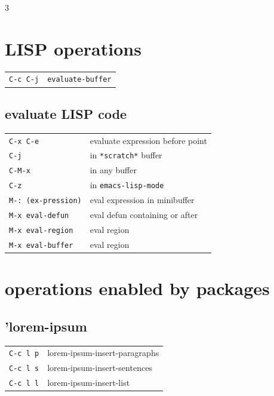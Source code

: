 \documentclass[11pt,landscape,a4paper]{article}
\begin{document}
\begin{multicols}{3}
\section{LISP operations}

\begin{tabular}{@{}ll@{}}
	{\color{darkred}\verb|C-c C-j|} & \verb|evaluate-buffer|\\ 
\end{tabular}

\subsection{evaluate LISP code}

\begin{tabular}{@{}ll@{}}
	{\verb|C-x C-e|} 					& evaluate expression before point\\
	{\verb|C-j|} 							& in \verb|*scratch*|	buffer		\\
	{\verb|C-M-x|} 					  & in any buffer		\\
	{\verb|C-z|} 							& in \verb|emacs-lisp-mode|\\
	{\verb|M-: (ex-pression)|} 							& eval expression	in minibuffer\\
	{\verb|M-x eval-defun|}		& eval defun containing or after\\
	{\verb|M-x eval-region|}	& eval region\\
	{\verb|M-x eval-buffer|} 	& eval region\\
\end{tabular}

\vspace*{1em}

\section{operations enabled by packages}

\subsection{'lorem-ipsum}


\begin{tabular}{@{}ll@{}}
	{\color{cgreen}\verb|C-c l p|} 		& lorem-ipsum-insert-paragraphs\\
	{\color{cgreen}\verb|C-c l s|} 		& lorem-ipsum-insert-sentences\\
	{\color{cgreen}\verb|C-c l l|} 		& lorem-ipsum-insert-list\\
\end{tabular}


\end{multicols}
\end{document}
